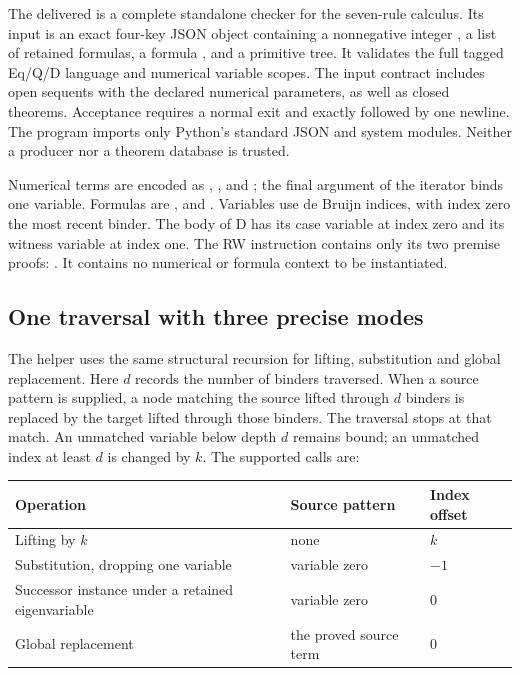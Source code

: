 \label{implementation:strict}

The delivered  is a complete standalone
checker for the seven-rule calculus. Its input is an exact four-key JSON
object containing a nonnegative integer , a list
 of retained formulas, a formula , and a
primitive  tree. It validates the full tagged Eq/Q/D language
and numerical variable scopes. The input contract includes open sequents
with the declared numerical parameters, as well as closed theorems.
Acceptance requires a normal exit and exactly  followed by
one newline. The program imports only Python's standard JSON and system
modules. Neither a producer nor a theorem database is trusted.

Numerical terms are encoded as \code{['v',i]}, \code{['z]},
\code{['s',a]} and \code{['i',n,a,h]}; the final argument of the iterator
binds one variable. Formulas are \code{['=',s,t]}, \code{['q',B]} and
\code{['d',B]}. Variables use de Bruijn indices, with index zero the most
recent binder. The body of D has its case variable at index zero and
its witness variable at index one. The RW instruction contains only its
two premise proofs: \code{['rw',p,q]}. It contains no numerical or formula
context to be instantiated.

\subsection{One traversal with three precise modes}

The helper  uses the same structural recursion for
lifting, substitution and global replacement. Here $d$ records the number
of binders traversed. When a source pattern is supplied, a node matching
the source lifted through $d$ binders is replaced by the target lifted
through those binders. The traversal stops at that match. An unmatched
variable below depth $d$ remains bound; an unmatched index at least $d$
is changed by $k$. The supported calls are:

\begin{center}\small
\begin{tabular}{@{}lll@{}}
\toprule
Operation & Source pattern & Index offset\\
\midrule
Lifting by $k$ & none & $k$\\
Substitution, dropping one variable & variable zero & $-1$\\
Successor instance under a retained eigenvariable & variable zero & $0$\\
Global replacement & the proved source term & $0$\\
\bottomrule
\end{tabular}
\end{center}

